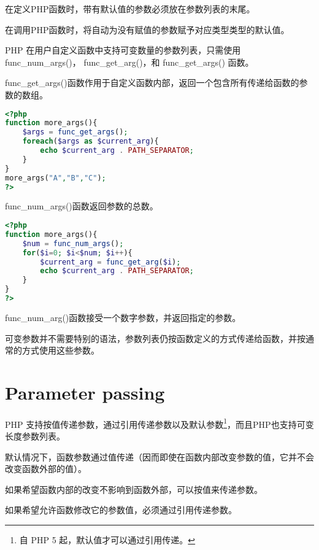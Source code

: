 \begin{compactitem}
\item 在定义PHP函数时，带有默认值的参数必须放在参数列表的末尾。
\item 在调用PHP函数时，将自动为没有赋值的参数赋予对应类型类型的默认值。
\end{compactitem}

PHP 在用户自定义函数中支持可变数量的参数列表，只需使用 func\_num\_args()， func\_get\_arg()，和 func\_get\_args() 函数。

\begin{compactitem}
\item func\_get\_args()函数作用于自定义函数内部，返回一个包含所有传递给函数的参数的数组。

\begin{lstlisting}[language=PHP]
<?php
function more_args(){
	$args = func_get_args();
	foreach($args as $current_arg){
		echo $current_arg . PATH_SEPARATOR;
	}
}
more_args("A","B","C");
?>
\end{lstlisting}

\item func\_num\_args()函数返回参数的总数。

\begin{lstlisting}[language=PHP]
<?php
function more_args(){
	$num = func_num_args();
	for($i=0; $i<$num; $i++){
		$current_arg = func_get_arg($i);
		echo $current_arg . PATH_SEPARATOR;
	}
}
?>
\end{lstlisting}


\item func\_num\_arg()函数接受一个数字参数，并返回指定的参数。

\end{compactitem}



可变参数并不需要特别的语法，参数列表仍按函数定义的方式传递给函数，并按通常的方式使用这些参数。



\section{Parameter passing}



PHP 支持按值传递参数，通过引用传递参数以及默认参数\footnote{自 PHP 5 起，默认值才可以通过引用传递。}，而且PHP也支持可变长度参数列表。


默认情况下，函数参数通过值传递（因而即使在函数内部改变参数的值，它并不会改变函数外部的值）。

\begin{compactitem}
\item 如果希望函数内部的改变不影响到函数外部，可以按值来传递参数。
\item 如果希望允许函数修改它的参数值，必须通过引用传递参数。
\end{compactitem}

